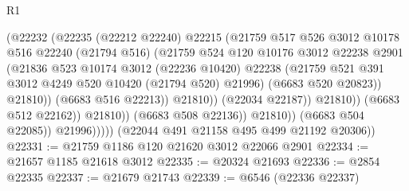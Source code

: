 \begin{lexlean}{R1}
\begin{coremodule}
                                      (@22232
                                        (@22235
                                          (@22212 @22240)
                                          @22215
                                          (@21759
                                            @517
                                            @526
                                            @3012
                                            @10178
                                            @516
                                            @22240
                                            (@21794 @516)
                                            (@21759
                                              @524
                                              @120
                                              @10176
                                              @3012
                                              @22238
                                              @2901
                                              (@21836
                                                @523
                                                @10174
                                                @3012
                                                (@22236 @10420)
                                                @22238
                                                (@21759
                                                  @521
                                                  @391
                                                  @3012
                                                  @4249
                                                  @520
                                                  @10420
                                                  (@21794 @520)
                                                  @21996)
                                                (@6683 @520 @20823))
                                              @21810))
                                          (@6683 @516 @22213))
                                        @21810))
                                    (@22034 @22187))
                                  @21810))
                              (@6683 @512 @22162))
                            @21810))
                        (@6683 @508 @22136))
                      @21810))
                  (@6683 @504 @22085))
                @21996)))))
      (@22044 @491 @21158 @495 @499 @21192 @20306))
@22331 := @21759 @1186 @120 @21620 @3012 @22066 @2901
@22334 := @21657 @1185 @21618 @3012
@22335 := @20324 @21693
@22336 := @2854 @22335
@22337 := @21679 @21743
@22339 := @6546 (@22336 @22337)

\end{coremodule}
\end{lexlean}
